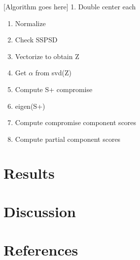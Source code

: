 \documentclass[man]{apa6}
\theoremstyle{definition}
\theoremstyle{definition}
\theoremstyle{definition}
\theoremstyle{remark}
\begin{document}
{[}Algorithm goes here{]} 1. Double center each

\begin{enumerate}
\def\labelenumi{\arabic{enumi}.}
\setcounter{enumi}{1}
\item
  Normalize
\item
  Check SSPSD
\item
  Vectorize to obtain Z
\item
  Get \(\alpha\) from svd(Z)
\item
  Compute S+ compromise
\item
  eigen(S+)
\item
  Compute compromise component scores
\item
  Compute partial component scores
\end{enumerate}

\hypertarget{results}{%
\section{Results}\label{results}}

\hypertarget{discussion}{%
\section{Discussion}\label{discussion}}

\newpage

\hypertarget{references}{%
\section{References}\label{references}}

\begingroup
\setlength{\parindent}{-0.5in}
\setlength{\leftskip}{0.5in}

\hypertarget{refs}{}

\endgroup
\end{document}
